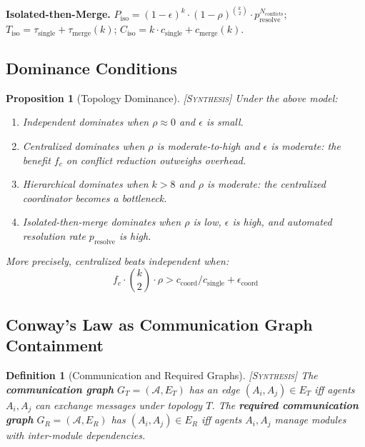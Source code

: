 \documentclass[11pt, a4paper, logo, copyright]{googledeepmind}
\newtheorem{definition}{Definition}[section]
\newtheorem{proposition}{Proposition}[section]
\newcommand{\synthesis}{\textsc{[Synthesis]}}
\begin{document}
\medskip
\noindent\textbf{Isolated-then-Merge.}
$P_{\mathrm{iso}} = (1-\epsilon)^k \cdot (1-\rho)^{\binom{k}{2}} \cdot p_{\mathrm{resolve}}^{N_{\mathrm{conflicts}}}$;
$T_{\mathrm{iso}} = \tau_{\mathrm{single}} + \tau_{\mathrm{merge}}(k)$;
$C_{\mathrm{iso}} = k \cdot c_{\mathrm{single}} + c_{\mathrm{merge}}(k)$.

\subsection{Dominance Conditions}

\begin{proposition}[Topology Dominance] \synthesis{}
\label{prop:dominance}
Under the above model:
\begin{enumerate}[nosep]
  \item Independent dominates when $\rho \approx 0$ and $\epsilon$ is small.
  \item Centralized dominates when $\rho$ is moderate-to-high and $\epsilon$ is moderate: the benefit $f_c$ on conflict reduction outweighs overhead.
  \item Hierarchical dominates when $k > 8$ and $\rho$ is moderate: the centralized coordinator becomes a bottleneck.
  \item Isolated-then-merge dominates when $\rho$ is low, $\epsilon$ is high, and automated resolution rate $p_{\mathrm{resolve}}$ is high.
\end{enumerate}

More precisely, centralized beats independent when:
\begin{equation}
  f_c \cdot \binom{k}{2} \cdot \rho > c_{\mathrm{coord}} / c_{\mathrm{single}} + \epsilon_{\mathrm{coord}}
\end{equation}
\end{proposition}

\subsection{Conway's Law as Communication Graph Containment}

\begin{definition}[Communication and Required Graphs] \synthesis{}
The \textbf{communication graph} $G_T = (\mathcal{A}, E_T)$ has an edge $(A_i, A_j) \in E_T$ iff agents $A_i, A_j$ can exchange messages under topology $T$.
The \textbf{required communication graph} $G_R = (\mathcal{A}, E_R)$ has $(A_i, A_j) \in E_R$ iff agents $A_i, A_j$ manage modules with inter-module dependencies.
\end{definition}
\end{document}
